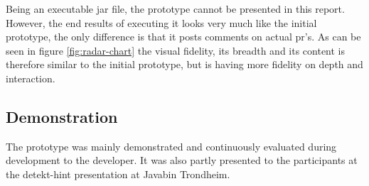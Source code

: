 \documentclass{report}
\begin{document}
Being an executable jar file, the prototype cannot be presented in this report. However, the end results of executing it looks very much like the initial prototype, the only difference is that it posts comments on actual \gls{pr}'s. As can be seen in figure \ref{fig:radar-chart} the visual fidelity, its breadth and its content is therefore similar to the initial prototype, but is having more fidelity on depth and interaction.  

\subsection*{Demonstration}
The prototype was mainly demonstrated and continuously evaluated during development to the developer. It was also partly presented to the participants at the detekt-hint presentation at Javabin Trondheim.
\end{document}
